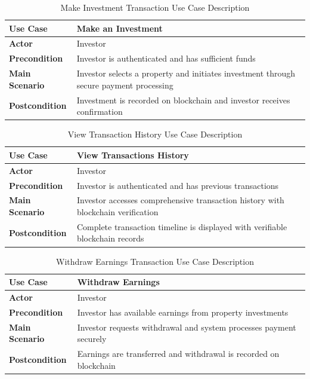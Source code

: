\begin{table}[htbp]
    \centering
    \begin{tabular}{|p{3cm}|p{10cm}|}
        \hline
        \textbf{Use Case} & \textbf{Make an Investment} \\
        \hline
        \textbf{Actor} & Investor \\
        \hline
        \textbf{Precondition} & Investor is authenticated and has sufficient funds \\
        \hline
        \textbf{Main Scenario} & Investor selects a property and initiates investment through secure payment processing \\
        \hline
        \textbf{Postcondition} & Investment is recorded on blockchain and investor receives confirmation \\
        \hline
    \end{tabular}
    \caption{Make Investment Transaction Use Case Description}
    \label{tab:make-investment-use-case}
\end{table}

\begin{table}[htbp]
    \centering
    \begin{tabular}{|p{3cm}|p{10cm}|}
        \hline
        \textbf{Use Case} & \textbf{View Transactions History} \\
        \hline
        \textbf{Actor} & Investor \\
        \hline
        \textbf{Precondition} & Investor is authenticated and has previous transactions \\
        \hline
        \textbf{Main Scenario} & Investor accesses comprehensive transaction history with blockchain verification \\
        \hline
        \textbf{Postcondition} & Complete transaction timeline is displayed with verifiable blockchain records \\
        \hline
    \end{tabular}
    \caption{View Transaction History Use Case Description}
    \label{tab:view-transactions-use-case}
\end{table}
\newpage
\begin{table}[htbp]
    \centering
    \begin{tabular}{|p{3cm}|p{10cm}|}
        \hline
        \textbf{Use Case} & \textbf{Withdraw Earnings} \\
        \hline
        \textbf{Actor} & Investor \\
        \hline
        \textbf{Precondition} & Investor has available earnings from property investments \\
        \hline
        \textbf{Main Scenario} & Investor requests withdrawal and system processes payment securely \\
        \hline
        \textbf{Postcondition} & Earnings are transferred and withdrawal is recorded on blockchain \\
        \hline
    \end{tabular}
    \caption{Withdraw Earnings Transaction Use Case Description}
    \label{tab:withdraw-earnings-use-case}
\end{table}

